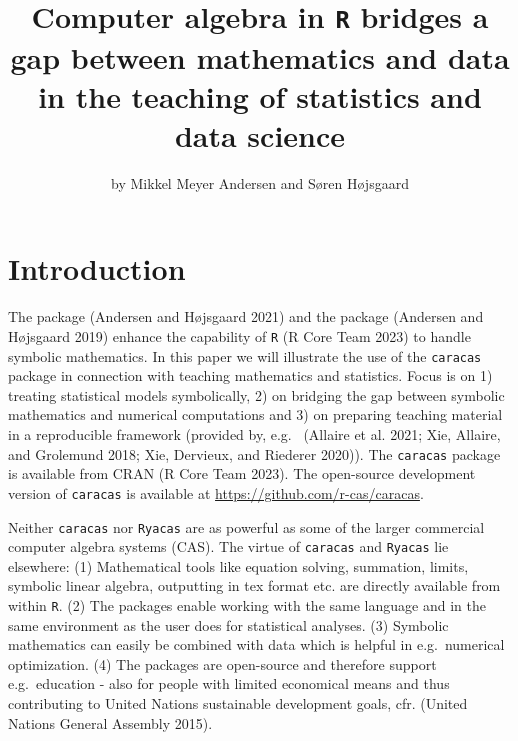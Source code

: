 \title{Computer algebra in \texttt{R} bridges a gap between mathematics and data in the teaching of statistics and data science}
\author{by Mikkel Meyer Andersen and Søren Højsgaard}

\maketitle


\hypertarget{introduction}{%
\section{Introduction}\label{introduction}}

The  package
(Andersen and Højsgaard 2021) and the  package (Andersen and Højsgaard 2019) enhance the capability of \texttt{R} (R Core Team 2023) to handle symbolic mathematics. In this paper
we will illustrate the use of the \texttt{caracas} package in connection with
teaching mathematics and statistics.
Focus
is on 1) treating statistical models symbolically, 2) on bridging the
gap between symbolic mathematics and numerical computations and 3) on
preparing teaching material in a reproducible framework (provided by, e.g.~
(Allaire et al. 2021; Xie, Allaire, and Grolemund 2018; Xie, Dervieux, and Riederer 2020)). The \texttt{caracas} package is available from CRAN (R Core Team 2023).
The open-source development version of \texttt{caracas} is available at
\url{https://github.com/r-cas/caracas}.

Neither \texttt{caracas} nor \texttt{Ryacas} are as powerful as some
of the larger commercial computer algebra systems (CAS). The virtue of
\texttt{caracas} and \texttt{Ryacas} lie elsewhere:
(1) Mathematical tools like equation solving, summation, limits, symbolic linear
algebra, outputting in tex format etc. are directly available from
within \texttt{R}.
(2) The packages enable working with the same language and in the same
environment as the user does for statistical analyses.
(3) Symbolic mathematics can easily be combined with data which is
helpful in e.g.~numerical optimization.
(4) The packages are open-source and therefore support e.g.~education - also for people
with limited economical means and thus contributing to United
Nations sustainable development goals, cfr. (United Nations General Assembly 2015).

